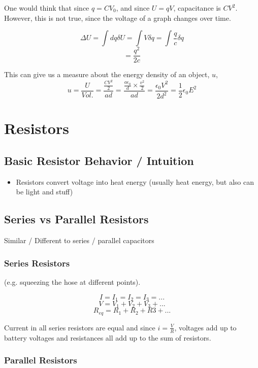 \documentclass{article}
\begin{document}
One would think that since $q = CV_0$, and since $U = qV$, capacitance is $CV^2$. However, this is not true, since the voltage of a graph changes over time.

$$\Delta U = \int d q \delta U = \int V \delta q  = \int \frac{q}{c} \delta q $$
$$ = \frac{q^2}{2c}$$

This can give us a measure about the energy density of an object, $u$,
$$u = \frac{U}{Vol.} = \frac{\frac{CV^2}{2}}{ad} = \frac{\frac{a \epsilon_0 }{d} \times \frac{v^2}{2}}{ad} = \frac{\epsilon_0 V^2}{2 d^2} = \frac{1}{2} \epsilon_0 E^2$$

\section{Resistors}

\subsection{Basic Resistor Behavior / Intuition}

\begin{itemize}
    \item Resistors convert voltage into heat energy (usually heat energy, but also can be light and stuff)
\end{itemize}

\subsection{Series vs Parallel Resistors}

Similar / Different to series / parallel capacitors

\subsubsection{Series Resistors}

(e.g. squeezing the hose at different points).

$$I = I_1 = I_2 = I_3 = ...$$
$$V = V_1 + V_2 + V_3 + ...$$
$$R_{eq} = R_1 + R_2 + R3 + ...$$

Current in all series resistors are equal and since $i = \frac{V}{R}$, voltages add up to battery voltages and resistances all add up to the sum of resistors.

\subsubsection{Parallel Resistors}
\end{document}
